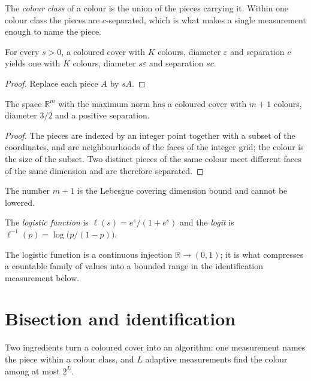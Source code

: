 The \emph{colour class} of a colour is the union of the pieces carrying it. Within one
colour class the pieces are $c$-separated, which is what makes a single measurement
enough to name the piece.

\begin{lemma}[Rescaling]
\label{lem:scale}
\leanok
{}
For every $s > 0$, a coloured cover with $K$ colours, diameter $\varepsilon$ and
separation $c$ yields one with $K$ colours, diameter $s\varepsilon$ and separation
$sc$.
\end{lemma}
\begin{proof}
\leanok
Replace each piece $A$ by $sA$.
\end{proof}

\begin{theorem}
\label{thm:lebesgue-cover}
\leanok
{}
The space $\mathbb{R}^m$ with the maximum norm has a coloured cover with $m + 1$
colours, diameter $3/2$ and a positive separation.
\end{theorem}
\begin{proof}
\leanok
The pieces are indexed by an integer point together with a subset of the coordinates,
and are neighbourhoods of the faces of the integer grid; the colour is the size of the
subset. Two distinct pieces of the same colour meet different faces of the same
dimension and are therefore separated.
\end{proof}

The number $m + 1$ is the Lebesgue covering dimension bound and cannot be lowered.

\begin{definition}
\label{def:logistic}
\leanok
The \emph{logistic function} is $\ell(s) = e^s / (1 + e^s)$ and the \emph{logit} is
$\ell^{-1}(p) = \log\bigl( p / (1 - p) \bigr)$.
\end{definition}

The logistic function is a continuous injection $\mathbb{R} \to (0,1)$; it is what
compresses a countable family of values into a bounded range in the identification
measurement below.

\chapter{Bisection and identification}
\label{ch:bisection}

Two ingredients turn a coloured cover into an algorithm: one measurement names the
piece within a colour class, and $L$ adaptive measurements find the colour among at
most $2^L$.


